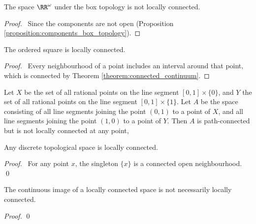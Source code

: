 \begin{corollary}
    The space $\RR^\omega$ under the box topology is not locally connected.
\end{corollary}

\begin{proof}
    \pf\ Since the components are not open (Proposition \ref{proposition:components_box_topology}).
\end{proof}

\begin{example}
    The ordered square is locally connected.
\end{example}

\begin{proof}
    \pf\ Every neighbourhood of a point includes an interval around that point, which is connected 
    by Theorem \ref{theorem:connected_continuum}.
\end{proof}

\begin{example}
    Let $X$ be the set of all rational points on the line segment $[0,1] \times \{0\}$,
    and $Y$ the set of all rational points on the line segment $[0,1] \times \{1\}$.
    Let $A$ be the space consisting of all line segments joining the point $(0,1)$ to a point
    of $X$, and all line segments joining the point $(1,0)$ to a point of $Y$. Then $A$ is
    path-connected but is not locally connected at any point,
\end{example}

\begin{proposition}
    Any discrete topological space is locally connected.
\end{proposition}

\begin{proof}
    \pf\ For any point $x$, the singleton $\{x\}$ is a connected open neighbourhood. \qed
\end{proof}

\begin{proposition}
    The continuous image of a locally connected space is not necessarily locally connected.
\end{proposition}

\begin{proof}
    \pf
    \qed
\end{proof}

